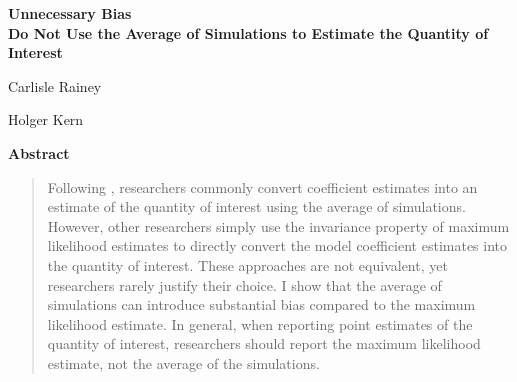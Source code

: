 \documentclass[10pt]{article}
\begin{document}
\begin{center}

{\LARGE \textbf{Unnecessary Bias}}\\\vspace{2mm}
{ \textbf{Do Not Use the Average of Simulations to Estimate the Quantity of Interest}}  

\vspace{5mm}


Carlisle Rainey 

\vspace{5mm}

Holger Kern

\vspace{5mm}

\end{center}

\vspace{5mm}

{\centerline{\textbf{Abstract}}}
\begin{quote}\noindent
Following \cite{KingTomzWittenberg2000}, researchers commonly convert coefficient estimates into an estimate of the quantity of interest using the average of simulations. 
However, other researchers simply use the invariance property of maximum likelihood estimates to directly convert the model coefficient estimates into the quantity of interest. 
These approaches are not equivalent, yet researchers rarely justify their choice. 
I show that the average of simulations can introduce substantial bias compared to the maximum likelihood estimate. 
In general, when reporting point estimates of the quantity of interest, researchers should report the maximum likelihood estimate, not the average of the simulations. 
 \end{quote}


\end{document}
